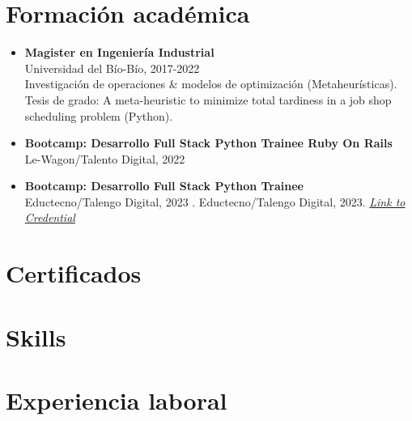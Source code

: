 \documentclass[a4paper,10pt]{article}
\begin{document}
	\section*{Formación académica}
	\begin{itemize}[left=0pt]
		\item \textbf{Magister en Ingeniería Industrial} \\
		Universidad del Bío-Bío, 2017-2022 \\
		Investigación de operaciones \& modelos de optimización (Metaheurísticas).
		Tesis de grado: A meta-heuristic to minimize total tardiness in a job shop scheduling problem (Python).
		
		\item \textbf{Bootcamp: Desarrollo Full Stack Python Trainee Ruby On Rails} \\
		Le-Wagon/Talento Digital, 2022
		
		\item \textbf{Bootcamp: Desarrollo Full Stack Python Trainee} \\
		Eductecno/Talengo Digital, 2023 .        Eductecno/Talengo Digital, 2023. \textit{\href{https://www.acreditta.com/credential/1654395b-6317-44bf-9beb-18774afdb129}{Link to Credential}}
		
		
	\end{itemize}
	
	\section*{Certificados}
	
	\section*{Skills}
	
	\section*{Experiencia laboral}
	
\end{document}
